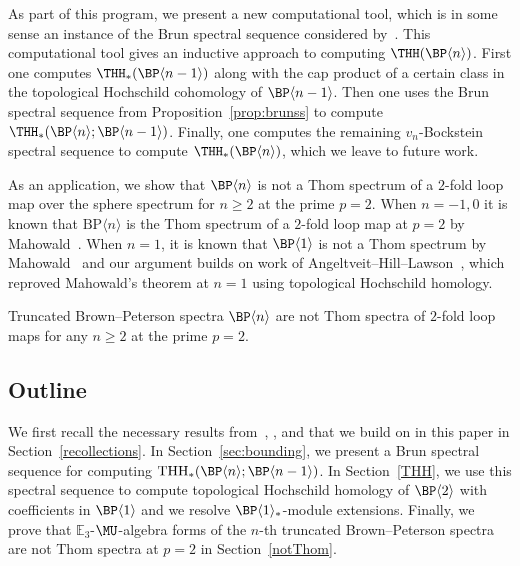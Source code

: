 As part of this program, we present a new computational tool, which is in some sense an instance of the Brun spectral sequence considered by~\cites{Bru00,Hon20}. This computational tool gives an inductive approach to computing $\THH(\BP\langle n\rangle)$. First one computes $\THH_*(\BP\langle n-1\rangle)$ along with the cap product of a certain class in the topological Hochschild cohomology of $\BP\langle n-1\rangle$. Then one uses the Brun spectral sequence from Proposition~\ref{prop:brunss} to compute $\THH_*(\BP\langle n\rangle;\BP\langle n-1\rangle)$.  Finally, one computes the remaining $v_{n}$-Bockstein spectral sequence to compute $\THH_*(\BP\langle n\rangle)$, which we leave to future work. 

As an application, we show that $\BP\langle n\rangle$ is not a Thom spectrum of a $2$-fold loop map over the sphere spectrum for $n\ge 2$ at the prime $p=2$. When $n=-1,0$ it is known that $\mathrm{BP}\langle n\rangle$ is the Thom spectrum of a $2$-fold loop map at $p=2$ by Mahowald~\cite{Mah79}. When $n=1$, it is known that $\BP\langle 1\rangle$ is not a Thom spectrum by Mahowald~\cite{Mah87} and our argument builds on work of Angeltveit--Hill--Lawson~\cite{AHL09}, which reproved Mahowald's theorem at $n=1$ using topological Hochschild homology. 
\begin{theorem}\label{thm:main-thom}
Truncated Brown--Peterson spectra $\BP\langle n\rangle$ are not Thom spectra of $2$-fold loop maps for any $n\ge 2$ at the prime $p=2$. 
\end{theorem}

\subsection{Outline}
We first recall the necessary results from~\cite{AHL10}, \cite{AR05}, and \cite{ACH24} that we build on in this paper in Section~\ref{recollections}. In Section~\ref{sec:bounding}, we present a Brun spectral sequence for computing $\mathrm{THH}_*(\BP\langle n\rangle ;\BP\langle n-1\rangle)$. In Section~\ref{THH}, we use this spectral sequence to compute topological Hochschild homology of $\BP\langle 2\rangle$ with coefficients in $\BP\langle 1\rangle$ and we resolve  $\BP\langle 1\rangle_*$-module extensions. Finally, we prove that $\mathbb{E}_3$-$\MU$-algebra forms of the $n$-th truncated Brown--Peterson spectra are not Thom spectra at $p=2$ in Section~\ref{notThom}. 


